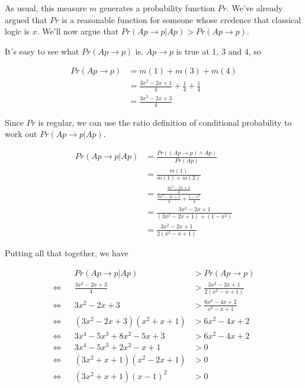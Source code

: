\noindent As usual, this measure $m$ generates a probability function $Pr$. We've already argued that $Pr$ is a reasonable function for someone whose credence that classical logic is $x$. We'll now argue that $Pr(Ap \rightarrow p | Ap) > Pr(Ap \rightarrow p)$.

It's easy to see what $Pr(Ap \rightarrow p)$ is. $Ap \rightarrow p$ is true at 1, 3 and 4, so 

\begin{align}
Pr(Ap \rightarrow p) &= m({1}) + m({3}) + m(4) \\
 &= \frac{3x^2 - 2x + 1}{4} + \frac{1}{4} + \frac{1}{4} \\
 &= \frac{3x^2 - 2x + 3}{4} 
\end{align}

\noindent Since $Pr$ is regular, we can use the ratio definition of conditional probability to work out $Pr(Ap \rightarrow p | Ap)$.

\begin{align}
Pr(Ap \rightarrow p | Ap) &= \frac{Pr((Ap \rightarrow p) \wedge Ap)}{Pr(Ap)} \\
 &= \frac{m({1})}{m({1}) + m({2})} \\
 &= \frac{\frac{3x^2 - 2x + 1}{4}}{\frac{3x^2 - 2x + 1}{4} + \frac{1-x^2}{4}} \\
 &= \frac{3x^2 - 2x + 1}{(3x^2 - 2x + 1) + (1-x^2)} \\
 &= \frac{3x^2 - 2x + 1}{2(x^2 - x + 1)} 
\end{align}

\noindent Putting all that together, we have

\begin{align}
&& Pr(Ap \rightarrow p | Ap) &> Pr(Ap \rightarrow p) \\
\Leftrightarrow &&  \frac{3x^2 - 2x + 3}{4}  &> \frac{3x^2 - 2x + 1}{2(x^2 - x + 1)} \\
\Leftrightarrow && 3x^2 - 2x + 3  &> \frac{6x^2 - 4x + 2}{x^2 - x + 1} \\
\Leftrightarrow && (3x^2 - 2x + 3)(x^2 + x + 1)  &> 6x^2 - 4x + 2 \\
\Leftrightarrow && 3x^4 - 5x^3 + 8x^2 - 5x + 3  &> 6x^2 - 4x + 2 \\
\Leftrightarrow && 3x^4 - 5x^3 + 2x^2 - x + 1 &> 0 \\
\Leftrightarrow && (3x^2 + x + 1)(x^2 - 2x + 1) &> 0 \\
\Leftrightarrow && (3x^2 + x + 1)(x - 1)^2 &> 0
\end{align}

